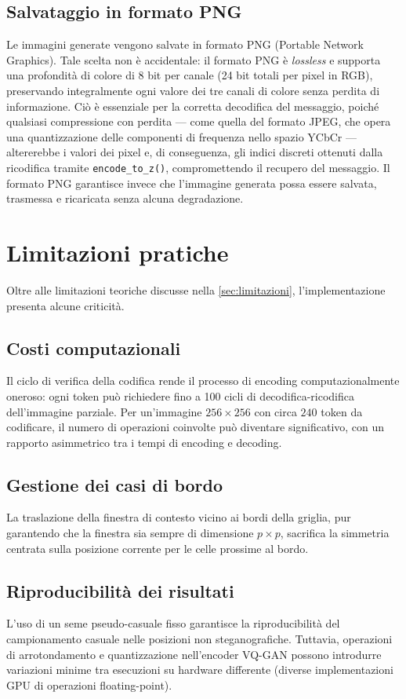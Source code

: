 \subsection{Salvataggio in formato PNG}

Le immagini generate vengono salvate in formato PNG (Portable Network Graphics). Tale scelta non è accidentale: il formato PNG è \emph{lossless} e supporta una profondità di colore di 8 bit per canale (24 bit totali per pixel in RGB), preservando integralmente ogni valore dei tre canali di colore senza perdita di informazione. Ciò è essenziale per la corretta decodifica del messaggio, poiché qualsiasi compressione con perdita — come quella del formato JPEG, che opera una quantizzazione delle componenti di frequenza nello spazio YCbCr — altererebbe i valori dei pixel e, di conseguenza, gli indici discreti ottenuti dalla ricodifica tramite \texttt{encode\_to\_z()}, compromettendo il recupero del messaggio. Il formato PNG garantisce invece che l'immagine generata possa essere salvata, trasmessa e ricaricata senza alcuna degradazione.

\section{Limitazioni pratiche}
\label{sec:limitazioni-pratiche}

Oltre alle limitazioni teoriche discusse nella \autoref{sec:limitazioni}, l'implementazione presenta alcune criticità.

\subsection{Costi computazionali}

Il ciclo di verifica della codifica rende il processo di encoding computazionalmente oneroso: ogni token può richiedere fino a 100 cicli di decodifica-ricodifica dell'immagine parziale. Per un'immagine $256 \times 256$ con circa $240$ token da codificare, il numero di operazioni coinvolte può diventare significativo, con un rapporto asimmetrico tra i tempi di encoding e decoding.

\subsection{Gestione dei casi di bordo}

La traslazione della finestra di contesto vicino ai bordi della griglia, pur garantendo che la finestra sia sempre di dimensione $p \times p$, sacrifica la simmetria centrata sulla posizione corrente per le celle prossime al bordo.

\subsection{Riproducibilità dei risultati}

L'uso di un seme pseudo-casuale fisso garantisce la riproducibilità del campionamento casuale nelle posizioni non steganografiche. Tuttavia, operazioni di arrotondamento e quantizzazione nell'encoder VQ-GAN possono introdurre variazioni minime tra esecuzioni su hardware differente (diverse implementazioni GPU di operazioni floating-point).